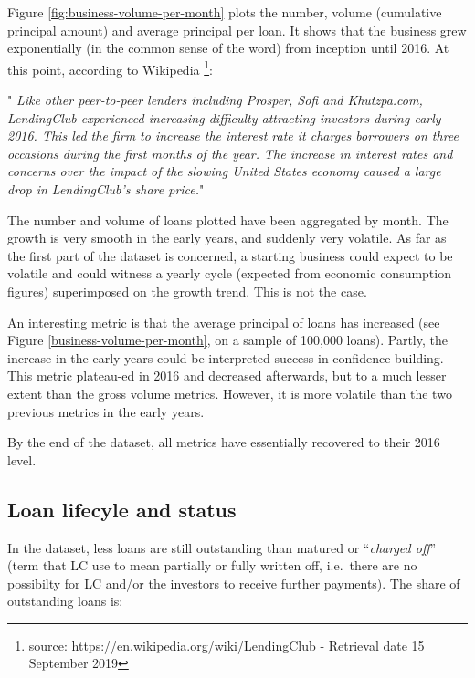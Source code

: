\documentclass[11pt,]{report}
\newenvironment{Shaded}{\begin{snugshade}}{\end{snugshade}}
\newcommand{\NormalTok}[1]{#1}
\let\rmarkdownfootnote\footnote%
\def\footnote{\protect\rmarkdownfootnote}
\begin{document}
Figure \ref{fig:business-volume-per-month} plots the number, volume (cumulative principal amount) and average principal per loan. It shows that the business grew exponentially (in the common sense of the word) from inception until 2016. At this point, according to Wikipedia \footnote{source: \url{https://en.wikipedia.org/wiki/LendingClub} - Retrieval date 15 September 2019}:

" \emph{Like other peer-to-peer lenders including Prosper, Sofi and Khutzpa.com, LendingClub experienced increasing difficulty attracting investors during early 2016. This led the firm to increase the interest rate it charges borrowers on three occasions during the first months of the year. The increase in interest rates and concerns over the impact of the slowing United States economy caused a large drop in LendingClub's share price.}"

The number and volume of loans plotted have been aggregated by month. The growth is very smooth in the early years, and suddenly very volatile. As far as the first part of the dataset is concerned, a starting business could expect to be volatile and could witness a yearly cycle (expected from economic consumption figures) superimposed on the growth trend. This is not the case.

An interesting metric is that the average principal of loans has increased (see Figure \ref{business-volume-per-month}, on a sample of 100,000 loans). Partly, the increase in the early years could be interpreted success in confidence building. This metric plateau-ed in 2016 and decreased afterwards, but to a much lesser extent than the gross volume metrics. However, it is more volatile than the two previous metrics in the early years.

By the end of the dataset, all metrics have essentially recovered to their 2016 level.

\hypertarget{loan-lifecyle-and-status}{%
\subsection{Loan lifecyle and status}\label{loan-lifecyle-and-status}}

In the dataset, less loans are still outstanding than matured or ``\emph{charged off}'' (term that LC use to mean partially or fully written off, i.e.~there are no possibilty for LC and/or the investors to receive further payments). The share of outstanding loans is:

\begin{Shaded}
\end{Shaded}
\end{document}
